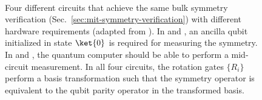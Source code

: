 \begin{figure}
    \centering
    \\
    \caption{Four different circuits that achieve the same bulk symmetry verification 
    (Sec.~\ref{sec:mit-symmetry-verification}) with different hardware requirements (adapted from \citet{bonet-monroigLowcostErrorMitigation2018}).
    In \protect{} and \protect{}, 
    an ancilla qubit initialized in state $\ket{0}$ is required for measuring the symmetry.
    In \protect{} and \protect{},
    the quantum computer should be able to perform a mid-circuit measurement.
    In all four circuits, the rotation gates $\{R_i\}$ perform a basis transformation such that
    the symmetry operator is equivalent to the qubit parity operator in the transformed basis.
    }
    \label{fig:mit-bulk-sym}
\end{figure}

